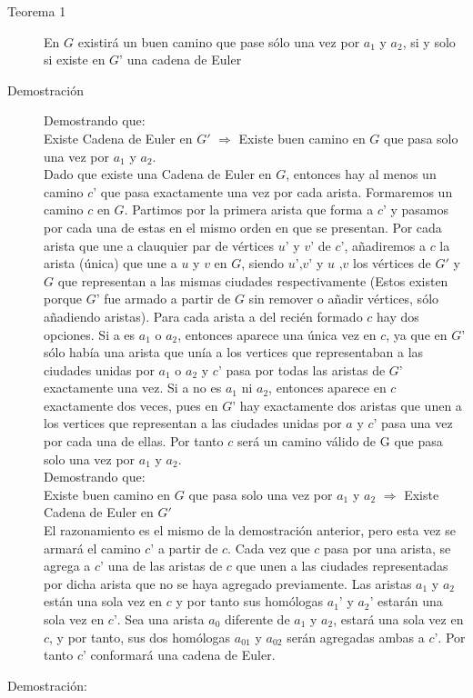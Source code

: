 \documentclass[a4paper,12pt,twocolumn]{article}
\begin{document}
	\begin{description}
		\item[Teorema 1] En $G$ existirá un buen camino que pase sólo una vez por $a_1$ y $a_2$, si y solo si existe en $G’$ una cadena de Euler
	\end{description}
	
	\begin{description}
		\item[Demostración] Demostrando que:\\ Existe Cadena de Euler en $G'$ $\Rightarrow$ Existe buen camino en $G$ que pasa solo una vez por $a_1$ y $a_2$.\\
		Dado que existe una Cadena de Euler en $G$, entonces hay al menos un camino $c’$ que pasa exactamente una vez por cada arista. Formaremos un camino $c$ en $G$. Partimos por la primera arista que forma a $c’$ y pasamos por cada una de estas en el mismo orden en que se presentan. Por cada arista que une a clauquier par de vértices $u’$ y $v’$ de $c’$, añadiremos a $c$ la arista (única) que une a $u$ y $v$ en $G$, siendo $u’$,$v’$ y $u$ ,$v$ los vértices de $G'$ y $G$ que representan a las mismas ciudades respectivamente (Estos existen porque $G’$ fue armado a partir de $G$ sin remover o añadir vértices, sólo añadiendo aristas). Para cada arista a del recién formado $c$ hay dos opciones. Si a es $a_1$ o $a_2$, entonces aparece una única vez en $c$, ya que en $G’$ sólo había una arista que unía a los vertices que representaban a las ciudades unidas por $a_1$ o $a_2$ y $c’$ pasa por todas las aristas de $G’$ exactamente una vez. Si a no es $a_1$ ni $a_2$, entonces aparece en $c$ exactamente dos veces, pues en $G’$ hay exactamente dos aristas que unen a los vertices que representan a las ciudades unidas por $a$ y $c’$ pasa una vez por cada una de ellas. Por tanto $c$ será un camino válido de G que pasa solo una vez por $a_1$ y $a_2$.\\
		
		Demostrando que:  \\Existe buen camino en $G$ que pasa solo una vez por $a_1$ y $a_2$ $\Rightarrow$ Existe Cadena de Euler en $G'$\\			
		El razonamiento es el mismo de la demostración anterior, pero esta vez se armará el camino $c’$ a partir de $c$. Cada vez que $c$ pasa por una arista, se agrega a $c’$ una de las aristas de $c$ que unen a las ciudades representadas por dicha arista que no se haya agregado previamente. Las aristas $a_1$ y $a_2$ están una sola vez en $c$ y por tanto sus homólogas $a_1’$ y $a_2’$ estarán una sola vez en $c’$. Sea una arista $a_0$ diferente de $a_1$ y $a_2$, estará una sola vez en $c$, y por tanto, sus dos homólogas $a_{01}$ y $a_{02}$ serán agregadas ambas a $c’$. Por tanto $c’$ conformará una cadena de Euler.
	\end{description}
	Demostración:\\
	
\end{document}
